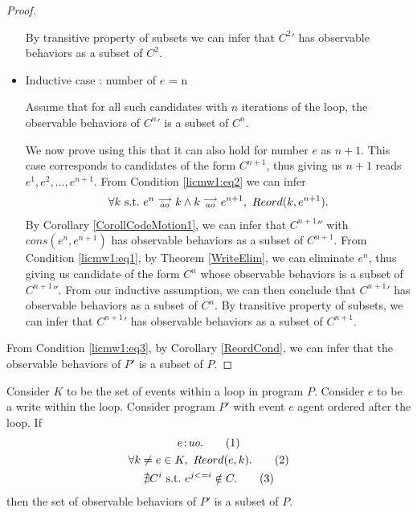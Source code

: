 \begin{proof}
\begin{itemize}
        
        By transitive property of subsets we can infer that $C^{2}'$ has observable behaviors as a subset of $C^2$.
        
        \item Inductive case : number of $e$ = n

        Assume that for all such candidates with $n$ iterations of the loop, the observable behaviors of $C^{n}'$ is a subset of $C^n$.

        We now prove using this that it can also hold for number $e$ as $n + 1$. 
        This case corresponds to candidates of the form $C^{n+1}$, thus giving us $n+1$ reads $e^1, e^2,...,e^{n+1}$.
        From Condition \ref{licmw1:eq2} we can infer 
        \begin{align*}
            \forall k \ \text{s.t.} \ e^n\stackrel{\longrightarrow}{_{ao}}k \wedge k\stackrel{\longrightarrow}{_{ao}}e^{n+1}, \ Reord(k,e^{n+1}).
        \end{align*}
        By Corollary \ref{CorollCodeMotion1}, we can infer that $C^{n+1}''$ with $cons(e^n, e^{n+1})$ has observable behaviors as a subset of $C^{n+1}$. 
        From Condition \ref{licmw1:eq1}, by Theorem \ref{WriteElim}, we can eliminate $e^{n}$, thus giving us candidate of the form $C^n$ whose observable behaviors is a subset of $C^{n+1}''$.
        From our inductive assumption, we can then conclude that $C^{n+1}'$ has observable behaviors as a subset of $C^n$. 
        By transitive property of subsets, we can infer that $C^{n+1}'$ has observable behaviors as a subset of $C^{n+1}$.

    \end{itemize}

    From Condition \ref{licmw1:eq3}, by Corollary \ref{ReordCond}, we can infer that the observable behaviors of $P'$ is a subset of $P$.

\end{proof}


\begin{corollary}
    \label{LoopInvCodeMotWrite2}
    Consider $K$ to be the set of events within a loop in program $P$. 
    Consider $e$ to be a write within the loop. 
    Consider program $P'$ with event $e$ agent ordered after the loop. 
    If
    \begin{gather*}
        e\!:\!\textit{uo}. \tag{1} \label{licmw2:eq1}\\
        \forall k \neq e \in K, \ Reord(e, k). \tag{2} \label{licmw2:eq2}\\ 
        \nexists C^i \ \text{s.t.} \ e^{j<=i} \notin C. \tag{3} \label{licmw2:eq3}                    
    \end{gather*}
    then the set of observable behaviors of $P'$ is a subset of $P$.

\end{corollary}             

